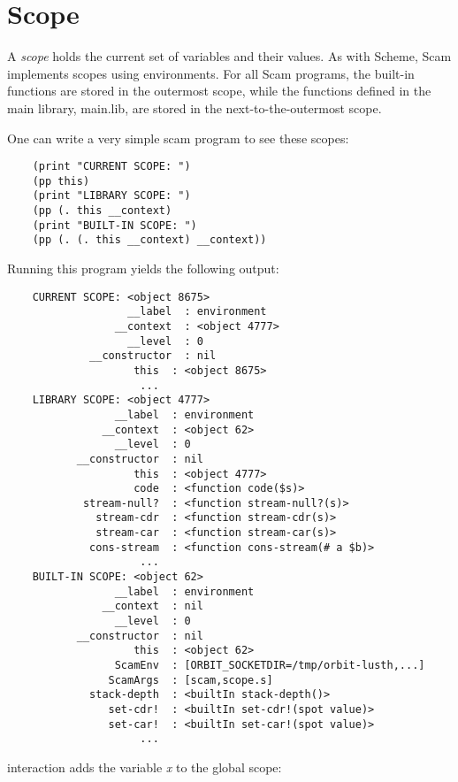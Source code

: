 \chapter{Scope}
\label{Scope}

A {\it scope} holds the current set of variables and their values.
As with Scheme, Scam implements scopes using environments.
For all Scam programs, the built-in functions are stored
in the outermost scope, while the functions defined
in the main library, main.lib, are stored in the next-to-the-outermost
scope.

One can write a very simple scam program to see these scopes:

\begin{verbatim}
    (print "CURRENT SCOPE: ")
    (pp this)
    (print "LIBRARY SCOPE: ")
    (pp (. this __context)
    (print "BUILT-IN SCOPE: ")
    (pp (. (. this __context) __context))
\end{verbatim}

Running this program yields the following output:

\begin{verbatim}
    CURRENT SCOPE: <object 8675>
                   __label  : environment
                 __context  : <object 4777>
                   __level  : 0
             __constructor  : nil
                    this  : <object 8675>
                     ...
    LIBRARY SCOPE: <object 4777>
                 __label  : environment
               __context  : <object 62>
                 __level  : 0
           __constructor  : nil
                    this  : <object 4777>
                    code  : <function code($s)>
            stream-null?  : <function stream-null?(s)>
              stream-cdr  : <function stream-cdr(s)>
              stream-car  : <function stream-car(s)>
             cons-stream  : <function cons-stream(# a $b)>
                     ...
    BUILT-IN SCOPE: <object 62>
                 __label  : environment
               __context  : nil
                 __level  : 0
           __constructor  : nil
                    this  : <object 62>
                 ScamEnv  : [ORBIT_SOCKETDIR=/tmp/orbit-lusth,...]
                ScamArgs  : [scam,scope.s]
             stack-depth  : <builtIn stack-depth()>
                set-cdr!  : <builtIn set-cdr!(spot value)>
                set-car!  : <builtIn set-car!(spot value)>
                     ...
\end{verbatim}

interaction adds the variable {\it x} to the global scope:

